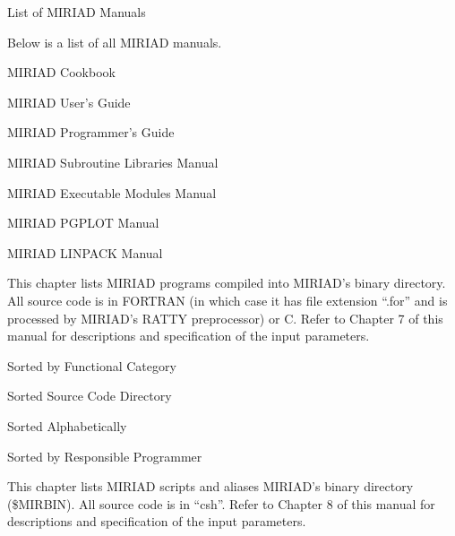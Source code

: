 \beginsection List of MIRIAD Manuals
\par Below is a list of all MIRIAD manuals. \par
\medskip\par{\parindent=0.5cm
MIRIAD Cookbook                    \par
MIRIAD User's Guide                \par
MIRIAD Programmer's Guide          \par
MIRIAD Subroutine Libraries Manual \par
MIRIAD Executable Modules Manual   \par
MIRIAD PGPLOT Manual               \par
MIRIAD LINPACK Manual              \par
}

\endchapter

This chapter lists MIRIAD programs compiled into MIRIAD's
binary directory. All source code is in FORTRAN (in which case it
has file extension ``.for'' and is processed by MIRIAD's RATTY
preprocessor) or C. Refer to Chapter 7 of this manual for descriptions
and specification of the input parameters.

\beginsection Sorted by Functional Category
\par

\beginsection Sorted Source Code Directory
\par

\beginsection Sorted Alphabetically
\par

\beginsection Sorted by Responsible Programmer
\par
\vfill\eject

\endchapter

This chapter lists MIRIAD scripts and aliases MIRIAD's
binary directory (\$MIRBIN). All source code is in ``csh''. Refer to
Chapter 8 of this manual for descriptions and specification of the input
parameters.


